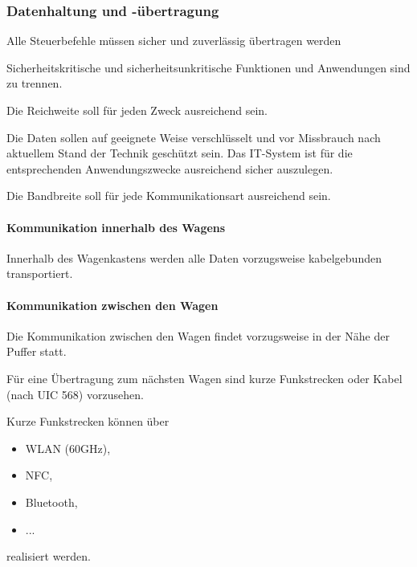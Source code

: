 \subsubsection{Datenhaltung und -übertragung}
\begin{feat}
Alle Steuerbefehle müssen sicher und zuverlässig übertragen werden
\end{feat}
\begin{feat}
Sicherheitskritische und sicherheitsunkritische Funktionen und Anwendungen sind zu trennen.
\end{feat}
\begin{feat}
Die Reichweite soll für jeden Zweck ausreichend sein.%
\end{feat}
\begin{feat}
Die Daten sollen auf geeignete Weise verschlüsselt und vor Missbrauch nach aktuellem Stand der Technik geschützt sein.
Das IT-System ist für die entsprechenden Anwendungszwecke ausreichend sicher auszulegen.
\end{feat}
\begin{feat}
Die Bandbreite soll für jede Kommunikationsart ausreichend sein.
\end{feat}

\paragraph{Kommunikation innerhalb des Wagens}
\begin{feat}
Innerhalb des Wagenkastens werden alle Daten vorzugsweise kabelgebunden transportiert. 
\end{feat}

\paragraph{Kommunikation zwischen den Wagen}
\begin{feat}
Die Kommunikation zwischen den Wagen findet vorzugsweise in der Nähe der Puffer statt.
\end{feat}
\begin{feat}
Für eine Übertragung zum nächsten Wagen sind kurze Funkstrecken oder Kabel (nach UIC 568) vorzusehen.
\end{feat}
\begin{rem}[zu Anf. 37]
Kurze Funkstrecken können über
\begin{itemize}
    \item WLAN (60GHz),
    \item NFC,
    \item Bluetooth,
    \item ...
\end{itemize}
realisiert werden.
\end{rem}

